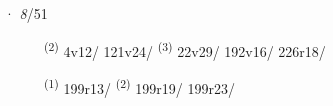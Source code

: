 \noindent{} · \textit{8}/51 \LEMMALINE
\begin{description}
    \item[]  \textsuperscript{(2)} \mbox{4v12/} \mbox{121v24/} \CASEBREAK {} \textsuperscript{(3)} \mbox{22v29/} \mbox{192v16/} \mbox{226r18/}
    \item[]  \textsuperscript{(1)} \mbox{199r13/} \textsuperscript{(2)} \mbox{199r19/} \mbox{199r23/}
\end{description}
\ENTRYEND
